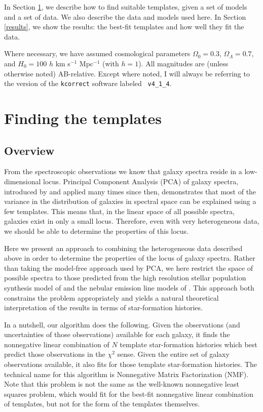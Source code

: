 \documentclass[10pt,preprint]{aastex}
\begin{document}
In Section \ref{algorithm}, we describe how to find suitable
templates, given a set of models and a set of data. We also describe
the data and models used here. In Section \ref{results}, we show the
results: the best-fit templates and how well they fit the data. 

Where necessary, we have assumed cosmological parameters $\Omega_0 =
0.3$, $\Omega_\Lambda = 0.7$, and $H_0 = 100$ $h$ km s$^{-1}$
Mpc$^{-1}$ (with $h=1$). All magnitudes are (unless otherwise noted)
AB-relative.  Except where noted, I will always be referring to the
version of the {\tt kcorrect} software labeled {\tt
v4\_1\_4}. 

\section{Finding the templates}
\label{algorithm}

\subsection{Overview}

From the spectroscopic observations we know that galaxy spectra reside
in a low-dimensional locus. Principal Component Analysis (PCA) of
galaxy spectra, introduced by \citet{connolly95b} and applied many
times since then, demonstrates that most of the variance in the
distribution of galaxies in spectral space can be explained using a
few templates. This means that, in the linear space of all possible
spectra, galaxies exist in only a small locus. Therefore, even with
very heterogeneous data, we should be able to determine the properties
of this locus.

Here we present an approach to combining the heterogeneous data
described above in order to determine the properties of the locus of
galaxy spectra. Rather than taking the model-free approach used by
PCA, we here restrict the space of possible spectra to those predicted
from the high resolution stellar population synthesis model of
\citet{bruzual03a} and the nebular emission line models of \citet{kewley01a}.
This approach both constrains the problem appropriately and yields a
natural theoretical interpretation of the results in terms of
star-formation histories.

In a nutshell, our algorithm does the following. Given the
observations (and uncertainties of those observations) available for
each galaxy, it finds the nonnegative linear combination of $N$
template star-formation histories which best predict those
observations in the $\chi^2$ sense. Given the entire set of galaxy
observations available, it also fits for those template star-formation
histories. The technical name for this algorithm is Nonnegative Matrix
Factorization (NMF). Note that this problem is not the same as the
well-known nonnegative least squares problem, which would fit for the
best-fit nonnegative linear combination of templates, but not for the
form of the templates themselves.
\end{document}
